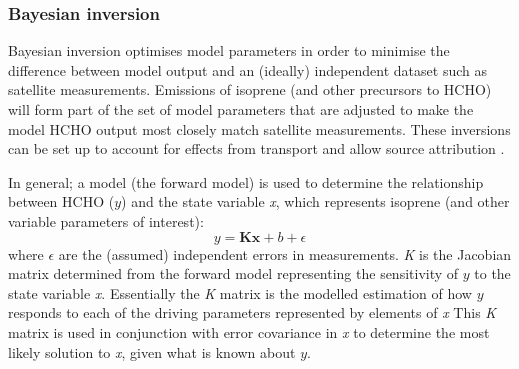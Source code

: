     
    
    
    \subsubsection{Bayesian inversion}
    
      Bayesian inversion optimises model parameters in order to minimise the difference between model output and an (ideally) independent dataset such as satellite measurements.
      Emissions of isoprene (and other precursors to HCHO) will form part of the set of model parameters that are adjusted to make the model HCHO output most closely match satellite measurements.
      These inversions can be set up to account for effects from transport and allow source attribution \parencite[e.g.][]{Curci2010,FortemsCheiney2012}.
      
      In general; a model (the forward model) is used to determine the relationship between HCHO ($y$) and the state variable \emph{x}, which represents isoprene (and other variable parameters of interest):
      \begin{equation}
        \label{BioIsop:intro:top_down_estimates:eqn_bayesian}
        y=\mathbf{Kx} + b + \epsilon
      \end{equation}
      where $\epsilon$ are the (assumed) independent errors in measurements.
      \emph{K} is the Jacobian matrix determined from the forward model representing the sensitivity of $y$ to the state variable \emph{x}.
      Essentially the \emph{K} matrix is the modelled estimation of how $y$ responds to each of the driving parameters represented by elements of \emph{x}
      This \emph{K} matrix is used in conjunction with error covariance in \emph{x} to determine the most likely solution to \emph{x}, given what is known about $y$. %
      
